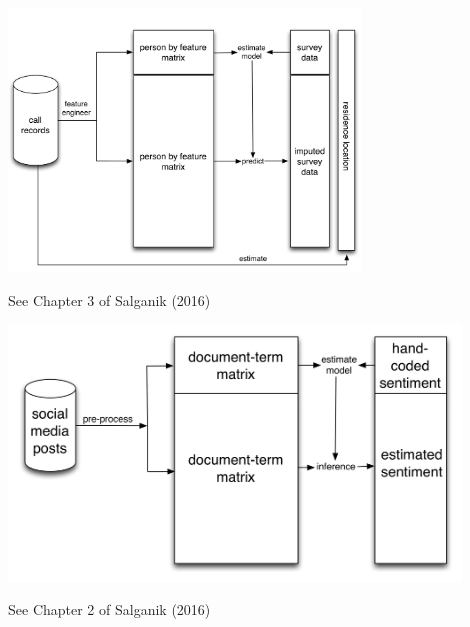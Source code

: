 \documentclass[aspectratio=169]{beamer}
\begin{document}
\begin{frame}

\begin{center}
\includegraphics[width=0.7\textwidth]{figures/blumenstock_predicting_2015_schematic_6}
\end{center}
\vfill
See Chapter 3 of Salganik (2016)
\end{frame}
\begin{frame}

\begin{center}
\includegraphics[width=0.9\textwidth]{figures/king_how_2013_schematic}
\end{center}
\vfill
See Chapter 2 of Salganik (2016)
\end{frame}
\end{document}
